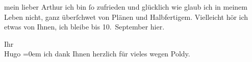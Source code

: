 \pstart{}mein lieber Arthur\pend\vspace{0.5em}
\pstart
           ich bin{ }ſo zufrieden und glücklich wie glaub ich in meinem Leben nicht, ganz
                  überſchwe{\geminationm}t von Plänen und Halbfertigem. Vielleicht
               hör ich etwas von Ihnen, ich bleibe bis 10. September hier.\pend
           
\pstart
           Ihr{\\[\baselineskip]}\spacefill\mbox{Hugo}\pend
           \leftskip=0em{}
\pstart
           \noindent{}ich dank Ihnen herzlich für vieles wegen Poldy.\pend
           \endnumbering{}  \newcommand{\dateiname}{L00718}\newcommand{\titel}{Hugo von Hofmannsthal an Arthur Schnitzler, 26. 8. 1897}\newcommand{\editorInnen}{Martin Anton Müller und Gerd-Hermann Susen}
